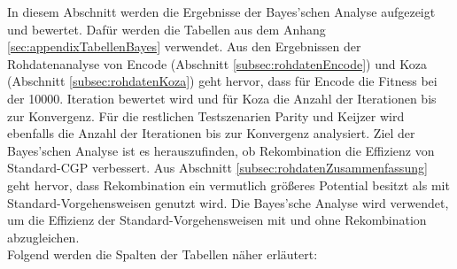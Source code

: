In diesem Abschnitt werden die Ergebnisse der Bayes'schen Analyse aufgezeigt und bewertet.
Dafür werden die Tabellen aus dem Anhang \ref{sec:appendixTabellenBayes} verwendet.
Aus den Ergebnissen der Rohdatenanalyse von Encode (Abschnitt \ref{subsec:rohdatenEncode}) und Koza (Abschnitt \ref{subsec:rohdatenKoza}) geht hervor, dass für Encode die Fitness bei der 10000. Iteration bewertet wird und für Koza die Anzahl der Iterationen bis zur Konvergenz.
Für die restlichen Testszenarien Parity und Keijzer wird ebenfalls die Anzahl der Iterationen bis zur Konvergenz analysiert.
Ziel der Bayes'schen Analyse ist es herauszufinden, ob Rekombination die Effizienz von Standard-CGP verbessert.
Aus Abschnitt \ref{subsec:rohdatenZusammenfassung} geht hervor, dass Rekombination ein vermutlich größeres Potential besitzt als mit Standard-Vorgehensweisen genutzt wird.
Die Bayes'sche Analyse wird verwendet, um die Effizienz der Standard-Vorgehensweisen mit und ohne Rekombination abzugleichen.\\
Folgend werden die Spalten der Tabellen näher erläutert:
